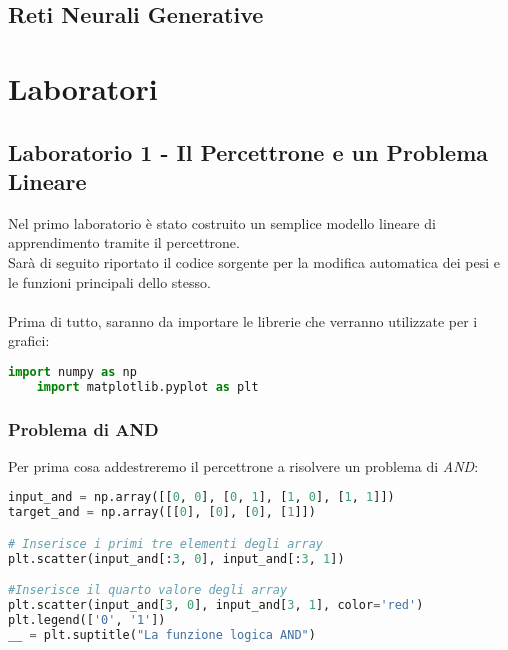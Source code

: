 \documentclass[12pt, a4paper]{article}
\begin{document}
\subsection{Reti Neurali Generative}

\section{Laboratori}
\subsection{Laboratorio 1 - Il Percettrone e un Problema Lineare}
Nel primo laboratorio è stato costruito un semplice modello lineare di apprendimento tramite il percettrone.\\
Sarà di seguito riportato il codice sorgente per la modifica automatica dei pesi e le funzioni principali dello stesso.\\
\\
Prima di tutto, saranno da importare le librerie che verranno utilizzate per i grafici:
\begin{lstlisting}[language=Python, caption=Importazione delle librerie]
    import numpy as np
    import matplotlib.pyplot as plt
\end{lstlisting}

\subsubsection{Problema di AND}
Per prima cosa addestreremo il percettrone a risolvere un problema di \textit{AND}:
\begin{lstlisting}[language=Python, caption=Inizializzazione]
input_and = np.array([[0, 0], [0, 1], [1, 0], [1, 1]])
target_and = np.array([[0], [0], [0], [1]])

# Inserisce i primi tre elementi degli array
plt.scatter(input_and[:3, 0], input_and[:3, 1]) 

#Inserisce il quarto valore degli array
plt.scatter(input_and[3, 0], input_and[3, 1], color='red')
plt.legend(['0', '1'])
__ = plt.suptitle("La funzione logica AND")
\end{lstlisting}
\end{document}
